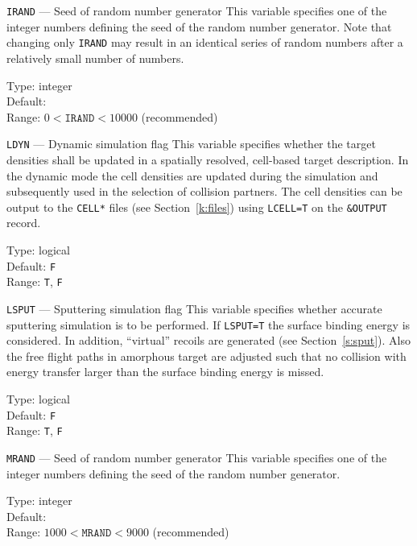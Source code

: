 \begin{keydescription}{\texttt{IRAND} --- Seed of random number generator}
%
  This variable specifies one of the integer numbers defining the seed of
  the random number generator. Note that changing only \texttt{IRAND}
  may result in an identical series of random numbers after a
  relatively small number of numbers. 
%
  \begin{keytab}
    Type:    \> integer \\
    Default:  \\
    Range:   \> $0 < \texttt{IRAND} < 10000$ (recommended)
  \end{keytab}
\end{keydescription}

\begin{keydescription}{\texttt{LDYN} --- Dynamic simulation flag}
%
  This variable specifies whether the target densities shall be
  updated in a spatially resolved, cell-based target description.  In
  the dynamic mode the cell densities are updated during the simulation
  and subsequently used in the selection of collision partners.  The cell 
  densities can be output to the \texttt{CELL*} files (see 
  Section~\ref{k:files}) using \texttt{LCELL=T} on the \texttt{\&OUTPUT}
  record.
%
  \begin{keytab}
    Type:    \> logical \\
    Default: \> \texttt{F} \\
    Range:   \> \texttt{T}, \texttt{F}
  \end{keytab}
\end{keydescription}

\begin{keydescription}{\texttt{LSPUT} --- Sputtering simulation flag}
%
  This variable specifies whether accurate sputtering simulation is to be
  performed. If \texttt{LSPUT=T} the surface binding energy is
  considered. In addition, ``virtual'' recoils are generated (see 
  Section~\ref{s:sput}). Also the free flight paths in amorphous target are 
  adjusted such that no collision with energy transfer larger than the surface 
  binding energy is missed.
%
  \begin{keytab}
    Type:    \> logical \\
    Default: \> \texttt{F} \\
    Range:   \> \texttt{T}, \texttt{F}
  \end{keytab}
\end{keydescription}

\begin{keydescription}{\texttt{MRAND} --- Seed of random number generator}
%
  This variable specifies one of the integer numbers defining the seed of
  the random number generator.
%
  \begin{keytab}
    Type:    \> integer \\
    Default:  \\
    Range:   \> $1000 < \texttt{MRAND} < 9000$ (recommended)
  \end{keytab}
\end{keydescription}

